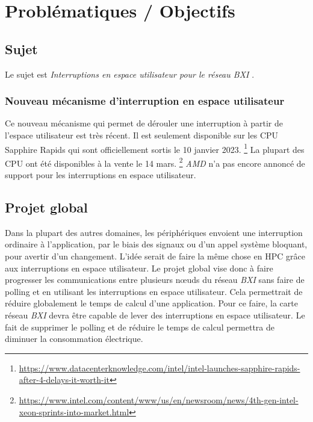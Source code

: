 \section{Problématiques / Objectifs} %

\subsection{Sujet}

Le sujet est \emph{Interruptions en espace utilisateur pour le réseau BXI} \cite{internshipSubject}.

\subsubsection{Nouveau mécanisme d'interruption en espace utilisateur}

Ce nouveau mécanisme qui permet de dérouler une interruption à partir de l'espace utilisateur est très récent.
Il est seulement disponible sur les CPU \intel{} Sapphire Rapids qui sont officiellement sortis le 10 janvier 2023.
\footnote{\url{https://www.datacenterknowledge.com/intel/intel-launches-sapphire-rapids-after-4-delays-it-worth-it}}
La plupart des CPU ont été disponibles à la vente le 14 mars.
\footnote{\url{https://www.intel.com/content/www/us/en/newsroom/news/4th-gen-intel-xeon-sprints-into-market.html}}
\emph{AMD} n'a pas encore annoncé de support pour les interruptions en espace utilisateur.

\subsection{Projet global}

Dans la plupart des autres domaines, les périphériques envoient une interruption ordinaire à l'application, par le biais des signaux ou d'un appel système bloquant, pour avertir d'un changement.
L'idée serait de faire la même chose en HPC grâce aux interruptions en espace utilisateur.
Le projet global vise donc à faire progresser les communications entre plusieurs nœuds du réseau \emph{BXI} sans faire de polling et en utilisant les interruptions en espace utilisateur.
Cela permettrait de réduire globalement le temps de calcul d'une application.
Pour ce faire, la carte réseau \emph{BXI} devra être capable de lever des interruptions en espace utilisateur.
Le fait de supprimer le polling et de réduire le temps de calcul permettra de diminuer la consommation électrique.


